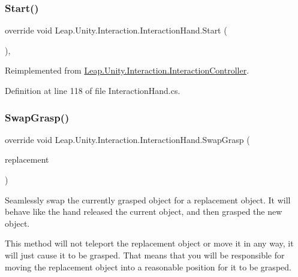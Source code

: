 \subsubsection{\texorpdfstring{Start()}{Start()}}
{\footnotesize\ttfamily override void Leap.\+Unity.\+Interaction.\+Interaction\+Hand.\+Start (\begin{DoxyParamCaption}{ }\end{DoxyParamCaption})\hspace{0.3cm}{\ttfamily [protected]}, {\ttfamily [virtual]}}



Reimplemented from \mbox{\hyperlink{class_leap_1_1_unity_1_1_interaction_1_1_interaction_controller_a697f206b8e73d177c203b3ca12874cb6}{Leap.\+Unity.\+Interaction.\+Interaction\+Controller}}.



Definition at line 118 of file Interaction\+Hand.\+cs.

\mbox{\label{class_leap_1_1_unity_1_1_interaction_1_1_interaction_hand_a0a175ec3d49aae78a5c6951fd744080b}} 
\subsubsection{\texorpdfstring{SwapGrasp()}{SwapGrasp()}}
{\footnotesize\ttfamily override void Leap.\+Unity.\+Interaction.\+Interaction\+Hand.\+Swap\+Grasp (\begin{DoxyParamCaption}\item[{\mbox{\hyperlink{interface_leap_1_1_unity_1_1_interaction_1_1_i_interaction_behaviour}{I\+Interaction\+Behaviour}}}]{replacement }\end{DoxyParamCaption})\hspace{0.3cm}{\ttfamily [virtual]}}



Seamlessly swap the currently grasped object for a replacement object. It will behave like the hand released the current object, and then grasped the new object. 

This method will not teleport the replacement object or move it in any way, it will just cause it to be grasped. That means that you will be responsible for moving the replacement object into a reasonable position for it to be grasped. 

